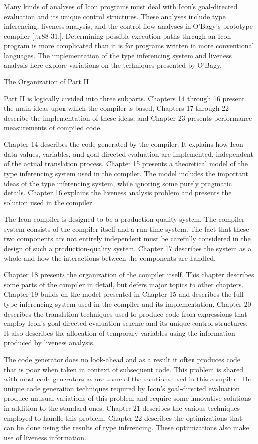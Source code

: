 Many kinds of analyses of Icon programs must deal with Icon's
goal-directed evaluation and its unique control structures. These
analyses include type inferencing, liveness analysis, and the control
flow analyses in O'Bagy's prototype compiler [.tr88-31.]. Determining
possible execution paths through an Icon program is more complicated
than it is for programs written in more conventional languages. The
implementation of the type inferencing system and liveness analysis
here explore variations on the techniques presented by O'Bagy.

{\sffamily
The Organization of Part II}


Part II is logically divided into three subparts. Chapters 14 through
16 present the main ideas upon which the compiler is based, Chapters
17 through 22 describe the implementation of these ideas, and Chapter
23 presents performance measurements of compiled code.

Chapter 14 describes the code generated by the compiler. It explains
how Icon data values, variables, and goal-directed evaluation are
implemented, independent of the actual translation process. Chapter 15
presents a theoretical model of the type inferencing system used in
the compiler. The model includes the important ideas of the type
inferencing system, while ignoring some purely pragmatic
details. Chapter 16 explains the liveness analysis problem and
presents the solution used in the compiler.

The Icon compiler is designed to be a production-quality system. The
compiler system consists of the compiler itself and a run-time
system. The fact that these two components are not entirely
independent must be carefully considered in the design of such a
production-quality system. Chapter 17 describes the system as a whole
and how the interactions between the components are handled.

Chapter 18 presents the organization of the compiler itself. This
chapter describes some parts of the compiler in detail, but defers
major topics to other chapters. Chapter 19 builds on the model
presented in Chapter 15 and describes the full type inferencing system
used in the compiler and its implementation. Chapter 20 describes the
translation techniques used to produce code from expressions that
employ Icon's goal-directed evaluation scheme and its unique control
structures. It also describes the allocation of temporary variables
using the information produced by liveness analysis.

The code generator does no look-ahead and as a result it often
produces code that is poor when taken in context of subsequent
code. This problem is shared with most code generators as are some of
the solutions used in this compiler.  The unique code generation
techniques required by Icon's goal-directed evaluation produce unusual
variations of this problem and require some innovative solutions in
addition to the standard ones. Chapter 21 describes the various
techniques employed to handle this problem. Chapter 22 describes the
optimizations that can be done using the results of type
inferencing. These optimizations also make use of liveness
information.

